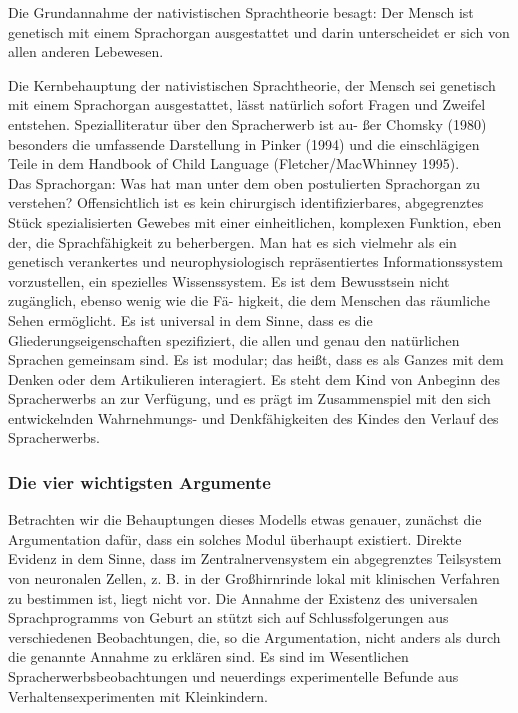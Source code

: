 \documentclass[
  letterpaper,
]{scrbook}
\begin{document}
Die Grundannahme der nativistischen Sprachtheorie besagt: Der Mensch ist
genetisch mit einem Sprachorgan ausgestattet und darin unterscheidet er
sich von allen anderen Lebewesen.

Die Kernbehauptung der nativistischen Sprachtheorie, der Mensch sei
genetisch mit einem Sprachorgan ausgestattet, lässt natürlich sofort
Fragen und Zweifel entstehen. Spezialliteratur über den Spracherwerb ist
au- ßer Chomsky (1980) besonders die umfassende Darstellung in Pinker
(1994) und die einschlägigen Teile in dem Handbook of Child Language
(Fletcher/MacWhinney 1995).\\

Das Sprachorgan: Was hat man unter dem oben postulierten Sprachorgan zu
verstehen? Offensichtlich ist es kein chirurgisch identifizierbares,
abgegrenztes Stück spezialisierten Gewebes mit einer einheitlichen,
komplexen Funktion, eben der, die Sprachfähigkeit zu beherbergen. Man
hat es sich vielmehr als ein genetisch verankertes und
neurophysiologisch repräsentiertes Informationssystem vorzustellen, ein
spezielles Wissenssystem. Es ist dem Bewusstsein nicht zugänglich,
ebenso wenig wie die Fä- higkeit, die dem Menschen das räumliche Sehen
ermöglicht. Es ist universal in dem Sinne, dass es die
Gliederungseigenschaften spezifiziert, die allen und genau den
natürlichen Sprachen gemeinsam sind. Es ist modular; das heißt, dass es
als Ganzes mit dem Denken oder dem Artikulieren interagiert. Es steht
dem Kind von Anbeginn des Spracherwerbs an zur Verfügung, und es prägt
im Zusammenspiel mit den sich entwickelnden Wahrnehmungs- und
Denkfähigkeiten des Kindes den Verlauf des Spracherwerbs.\\

\hypertarget{die-vier-wichtigsten-argumente}{%
\subsubsection{Die vier wichtigsten
Argumente}\label{die-vier-wichtigsten-argumente}}

Betrachten wir die Behauptungen dieses Modells etwas genauer, zunächst
die Argumentation dafür, dass ein solches Modul überhaupt existiert.
Direkte Evidenz in dem Sinne, dass im Zentralnervensystem ein
abgegrenztes Teilsystem von neuronalen Zellen, z. B. in der
Großhirnrinde lokal mit klinischen Verfahren zu bestimmen ist, liegt
nicht vor. Die Annahme der Existenz des universalen Sprachprogramms von
Geburt an stützt sich auf Schlussfolgerungen aus verschiedenen
Beobachtungen, die, so die Argumentation, nicht anders als durch die
genannte Annahme zu erklären sind. Es sind im Wesentlichen
Spracherwerbsbeobachtungen und neuerdings experimentelle Befunde aus
Verhaltensexperimenten mit Kleinkindern.
\end{document}
